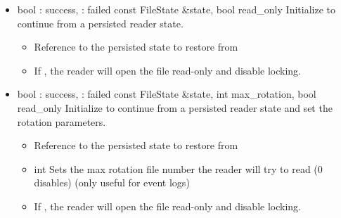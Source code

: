 \begin{itemize}
\item {}
  {bool} {: success, : failed}
  {const FileState \&state, bool read\_only}
  {Initialize to continue from a persisted reader state.}
  \begin{itemize}
  \item {}
    Reference to the persisted state to restore from
  \item {}
    If , the reader will open the file read-only and
    disable locking.
  \end{itemize}

\item {}
  {bool} {: success, : failed}
  {const FileState \&state, int max\_rotation, bool read\_only}
  {Initialize to continue from a persisted reader state and set the
  rotation parameters.}
  \begin{itemize}
  \item {}
    Reference to the persisted state to restore from
  \item {} {int}
    Sets the max rotation file number the reader will
    try to read (0 disables) (only useful for event logs)
  \item {}
    If , the reader will open the file read-only and
    disable locking.
  \end{itemize}

\end{itemize}

